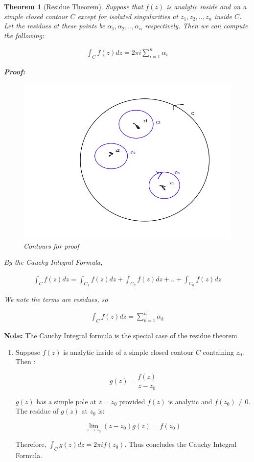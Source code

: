 \documentclass{article}
\newtheorem{theorem}{Theorem}[section]
\theoremstyle{definition}
\begin{document}
\begin{theorem}[Residue Theorem]
Suppose that $f(z)$ is analytic inside and on a simple closed contour $C$ except for isolated singularities at $z_1, z_2,..,z_n$ inside $C$. Let the residues at these points be $\alpha_1, \alpha_2,..,\alpha_n$ respectively. Then we can compute the following:


\begin{align*}
\int_C f(z) dz = 2 \pi i \sum_{i=1}^n \alpha_i
\end{align*}

\textbf{Proof:}

\begin{figure}[H]
	\centering
	\includegraphics[width=0.5\linewidth]{cnn}
	\caption{Contours for proof}
	\label{fig:cnn}
\end{figure}


By the Cauchy Integral Formula, 

\begin{align*}
\int_C f(z) dz = \int_{C_1} f(z) dz + \int_{C_2} f(z) dz + .. + \int_{C_n} f(z) dz
\end{align*}

We note the terms are residues, so 

\begin{align*}
\int_C f(z) dz = \sum_{k=1}^n \alpha_k 
\end{align*}


\end{theorem}

\textbf{Note:} The Cauchy Integral formula is the special case of the residue theorem.

\begin{enumerate}
	\item Suppose $f(z)$ is analytic inside of a simple closed contour $C$ containing $z_0$. Then :
	
	$$g(z) = \frac{f(z)}{z-z_0}$$
	
	$g(z)$ has a simple pole at $z=z_0$ provided $f(z)$ is analytic and $f(z_0) \neq 0$. The residue of $g(z)$ at $z_0$ is:
	
	$$\lim_{z \to z_0}(z-z_0)g(z) = f(z_0)$$
	
	Therefore, $\int_C g(z) dz = 2 \pi i f(z_0)$. Thus concludes the Cauchy Integral Formula. 
\end{enumerate}
\end{document}
